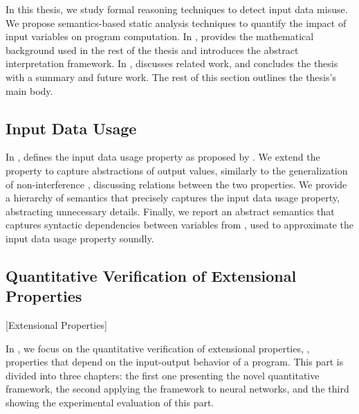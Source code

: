 In this thesis, we study formal reasoning techniques to detect input data misuse.
We propose semantics-based static analysis techniques to quantify the impact of input variables on program computation.
In ,
 provides the mathematical background used in the rest of the thesis and introduces the abstract interpretation framework.
In ,  discusses related work, and  concludes the thesis with a summary and future work.
The rest of this section outlines the thesis's main body.

\subsection{Input Data Usage}

In ,  defines the input data usage property as proposed by .
We extend the property to capture abstractions of output values, similarly to the generalization of non-interference , discussing relations between the two properties.
We provide a hierarchy of semantics that precisely captures the input data usage property, abstracting unnecessary details.
Finally, we report an abstract semantics that captures syntactic dependencies between variables from \textcite{Urban2018}, used to approximate the input data usage property soundly.

\subsection{Quantitative Verification of Extensional Properties}[Extensional Properties]

In , we focus on the quantitative verification of extensional properties, \ie, properties that depend on the input-output behavior of a program.
This part is divided into three chapters: the first one presenting the novel quantitative framework, the second applying the framework to neural networks, and the third showing the experimental evaluation of this part.

